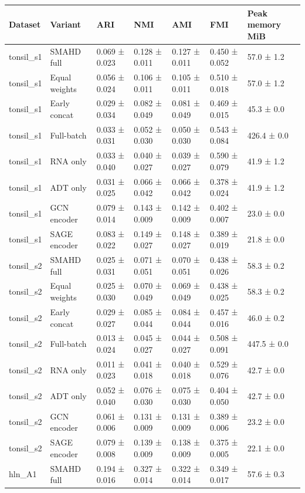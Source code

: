 \begin{tabular}{lllllll}
\toprule
Dataset & Variant & ARI & NMI & AMI & FMI & Peak memory MiB \\
\midrule
tonsil\_s1 & SMAHD full & 0.069 ± 0.023 & 0.128 ± 0.011 & 0.127 ± 0.011 & 0.450 ± 0.052 & 57.0 ± 1.2 \\
tonsil\_s1 & Equal weights & 0.056 ± 0.024 & 0.106 ± 0.011 & 0.105 ± 0.011 & 0.510 ± 0.018 & 57.0 ± 1.2 \\
tonsil\_s1 & Early concat & 0.029 ± 0.034 & 0.082 ± 0.049 & 0.081 ± 0.049 & 0.469 ± 0.015 & 45.3 ± 0.0 \\
tonsil\_s1 & Full-batch & 0.033 ± 0.031 & 0.052 ± 0.030 & 0.050 ± 0.030 & 0.543 ± 0.084 & 426.4 ± 0.0 \\
tonsil\_s1 & RNA only & 0.033 ± 0.040 & 0.040 ± 0.027 & 0.039 ± 0.027 & 0.590 ± 0.079 & 41.9 ± 1.2 \\
tonsil\_s1 & ADT only & 0.031 ± 0.025 & 0.066 ± 0.042 & 0.066 ± 0.042 & 0.378 ± 0.024 & 41.9 ± 1.2 \\
tonsil\_s1 & GCN encoder & 0.079 ± 0.014 & 0.143 ± 0.009 & 0.142 ± 0.009 & 0.402 ± 0.007 & 23.0 ± 0.0 \\
tonsil\_s1 & SAGE encoder & 0.083 ± 0.022 & 0.149 ± 0.027 & 0.148 ± 0.027 & 0.389 ± 0.019 & 21.8 ± 0.0 \\
tonsil\_s2 & SMAHD full & 0.025 ± 0.031 & 0.071 ± 0.051 & 0.070 ± 0.051 & 0.438 ± 0.026 & 58.3 ± 0.2 \\
tonsil\_s2 & Equal weights & 0.025 ± 0.030 & 0.070 ± 0.049 & 0.069 ± 0.049 & 0.438 ± 0.025 & 58.3 ± 0.2 \\
tonsil\_s2 & Early concat & 0.029 ± 0.027 & 0.085 ± 0.044 & 0.084 ± 0.044 & 0.457 ± 0.016 & 46.0 ± 0.2 \\
tonsil\_s2 & Full-batch & 0.013 ± 0.024 & 0.045 ± 0.027 & 0.044 ± 0.027 & 0.508 ± 0.091 & 447.5 ± 0.0 \\
tonsil\_s2 & RNA only & 0.011 ± 0.023 & 0.041 ± 0.018 & 0.040 ± 0.018 & 0.529 ± 0.076 & 42.7 ± 0.0 \\
tonsil\_s2 & ADT only & 0.052 ± 0.040 & 0.076 ± 0.030 & 0.075 ± 0.030 & 0.404 ± 0.050 & 42.7 ± 0.0 \\
tonsil\_s2 & GCN encoder & 0.061 ± 0.006 & 0.131 ± 0.009 & 0.131 ± 0.009 & 0.389 ± 0.006 & 23.2 ± 0.0 \\
tonsil\_s2 & SAGE encoder & 0.079 ± 0.008 & 0.139 ± 0.009 & 0.138 ± 0.009 & 0.375 ± 0.005 & 22.1 ± 0.0 \\
hln\_A1 & SMAHD full & 0.194 ± 0.016 & 0.327 ± 0.014 & 0.322 ± 0.014 & 0.349 ± 0.017 & 57.6 ± 0.3 \\

\end{tabular}
